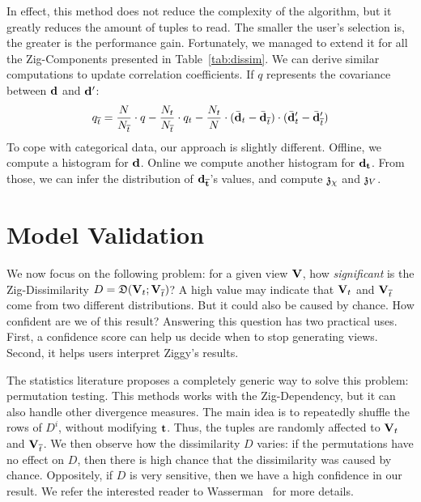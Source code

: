 In effect, this method does not reduce the complexity of the algorithm, but it
greatly reduces the amount of tuples to read. The smaller the user's selection
is, the greater is the performance gain. Fortunately, we managed to extend it
for all the Zig-Components presented in Table~\ref{tab:dissim}.  We can derive
similar computations to update correlation
coefficients. If $q$ represents the covariance between $\bf{d}$ and $\bf{d}'$:
\begin{equation}
    q_{\overline{t}} = \frac{N}{N_{\overline{t}}} \cdot q - \frac{N_t}{N_{\overline{t}}} \cdot q_t -
        \frac{N_t}{N} \cdot (\bar{\bf{d}}_t -  \bar{\bf{d}}_{\overline{t}}) \cdot
                             (\bar{\bf{d}}'_t -  \bar{\bf{d}}'_{\overline{t}}) 
\end{equation}
To cope with categorical data, our approach is slightly different. Offline, we
compute a histogram for $\bf{d}$.  Online we compute another histogram for
$\bf{d}_t$. From those, we can infer the distribution of $\bf{d}_{\overline{t}}$'s
values, and compute $\mathfrak{z}_\chi$ and $\mathfrak{z}_V$.

\section{Model Validation}
\label{sec:validation}
We now focus on the following problem: for a given view $\mathbf{V}$, how
\emph{significant} is the Zig-Dissimilarity $D = \mathfrak{D}( \mathbf{V}_t  ;
\mathbf{V}_{\overline{t}})$? A high value may indicate that $\mathbf{V}_t$ and
$\mathbf{V}_{\overline{t}}$ come from two different distributions.  But it could
also be caused by chance. How confident are we of this result? Answering this
question has two practical uses. First, a confidence score can help us decide
when to stop generating views. Second, it helps users interpret Ziggy's results.

The statistics literature proposes a completely ge\-ne\-ric way to solve
this problem: permutation testing. This methods works with the Zig-Dependency,
but it can also handle other divergence measures. The main idea is to
repeatedly shuffle the rows of $D^i$, without modifying $\mathbf{t}$. Thus, the
tuples are randomly affected to $\mathbf{V}_t$ and $\mathbf{V}_{\overline{t}}$. We
then observe how the dissimilarity $D$ varies: if the permutations have no
effect on $D$, then there is high chance that the dissimilarity was caused by
chance.  Oppositely, if $D$ is very sensitive,
then we have a high confidence in our result. We refer the interested
reader to Wasserman~\cite{wasserman2013all} for more details.

